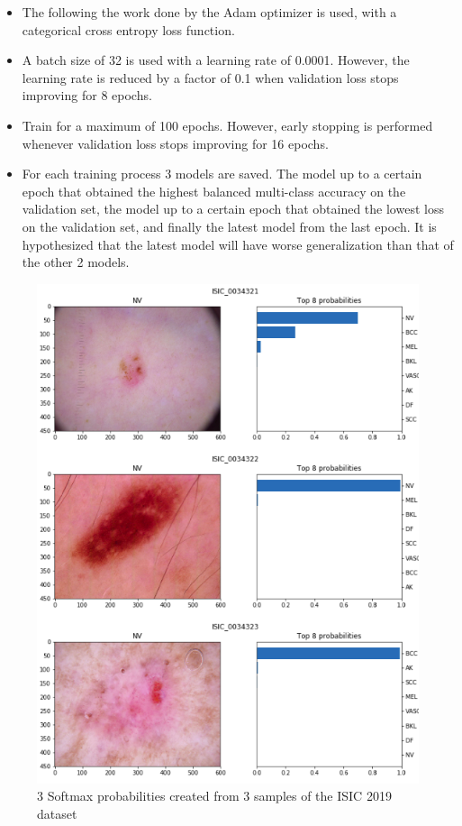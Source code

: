 \begin{itemize}
        \item The following the work done by \cite{gessert2018} the Adam optimizer is used, with a categorical cross entropy loss function. 
        \item A batch size of 32 is used with a learning rate of 0.0001. However, the learning rate is reduced by a factor of 0.1 when validation loss stops improving for 8 epochs.
        \item Train for a maximum of 100 epochs. However, early stopping is performed whenever validation loss stops improving for 16 epochs.
        \item For each training process 3 models are saved. The model up to a certain epoch that obtained the highest balanced multi-class accuracy on the validation set, the model up to a certain epoch that obtained the lowest loss on the validation set, and finally the latest model from the last epoch. It is hypothesized that the latest model will have worse generalization than that of the other 2 models. 
    \end{itemize}
    
    \begin{figure}[ht]
        \centering
        \includegraphics[scale=1.5, width=\textwidth]{figs/softmax_examples.png}
        \caption{3 Softmax probabilities created from 3 samples of the ISIC 2019 dataset}
        \label{fig:softmax_examples}
    \end{figure}
    
